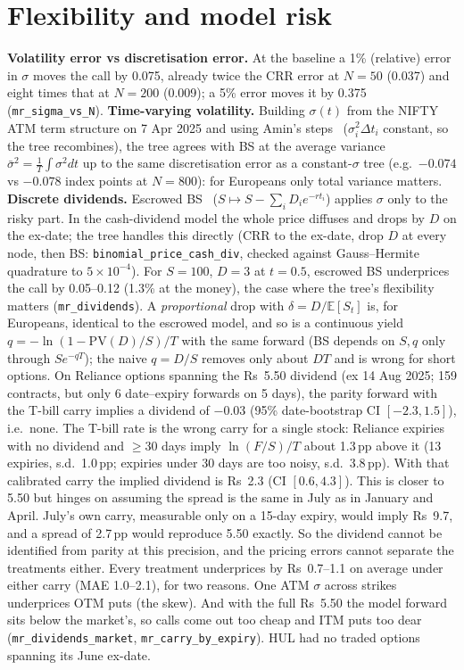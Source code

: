 \documentclass[10pt,a4paper]{article}
\newcommand{\code}[1]{\texttt{\small #1}}
\begin{document}
\section{Flexibility and model risk}
\textbf{Volatility error vs discretisation error.} At the baseline a 1\% (relative) error in $\sigma$ moves the call
by 0.075, already twice the CRR error at $N=50$ (0.037) and eight times that at $N=200$ (0.009); a 5\% error moves
it by 0.375 (\code{mr\_sigma\_vs\_N}).
\textbf{Time-varying volatility.} Building $\sigma(t)$ from the NIFTY ATM term structure on 7 Apr 2025 and using
Amin's steps~\cite{amin} ($\sigma_i^2\Delta t_i$ constant, so the tree recombines), the tree agrees with BS at the average
variance $\bar\sigma^2=\frac1T\int\sigma^2dt$ up to the same discretisation error as a constant-$\sigma$ tree
(e.g.\ $-0.074$ vs $-0.078$ index points at $N=800$): for Europeans only total variance matters.
\textbf{Discrete dividends.} Escrowed BS~\cite{hull} ($S\mapsto S-\sum_iD_ie^{-rt_i}$) applies $\sigma$ only to the risky part.
In the cash-dividend model the whole price diffuses and drops by $D$ on the ex-date; the tree handles this directly
(CRR to the ex-date, drop $D$ at every node, then BS: \code{binomial\_price\_cash\_div}, checked against
Gauss--Hermite quadrature to $5\times10^{-4}$). For $S=100$, $D=3$ at $t=0.5$, escrowed BS underprices the call by
0.05--0.12 (1.3\% at the money), the case where the tree's flexibility matters (\code{mr\_dividends}). A
\emph{proportional} drop with $\delta=D/\mathbb E[S_{t}]$ is, for Europeans, identical to the escrowed model, and so is
a continuous yield $q=-\ln(1-\mathrm{PV}(D)/S)/T$ with the same forward (BS depends on $S,q$ only through $Se^{-qT}$);
the naive $q=D/S$ removes only about $DT$ and is wrong for short options. On
Reliance options spanning the Rs~5.50 dividend (ex 14 Aug 2025; 159 contracts, but only 6 date--expiry forwards on
5 days), the parity forward with the T-bill carry implies a dividend of $-0.03$ (95\% date-bootstrap CI $[-2.3,1.5]$),
i.e.\ none. The T-bill rate is the wrong carry for a single stock: Reliance expiries with no dividend and $\ge30$
days imply $\ln(F/S)/T$ about 1.3\,pp above it (13 expiries, s.d.\ 1.0\,pp; expiries under 30 days are too noisy,
s.d.\ 3.8\,pp). With that calibrated carry the implied dividend is Rs~2.3 (CI $[0.6,4.3]$). This is closer to 5.50 but
hinges on assuming the spread is the same in July as in January and April. July's own carry, measurable only on a
15-day expiry, would imply Rs~9.7, and a spread of 2.7\,pp would reproduce 5.50 exactly. So the dividend cannot be
identified from parity at this precision, and the pricing errors cannot separate the treatments either. Every
treatment underprices by Rs~0.7--1.1 on average under either carry (MAE 1.0--2.1), for two reasons. One ATM
$\sigma$ across strikes underprices OTM puts (the skew). And with the full Rs~5.50 the model forward sits below the
market's, so calls come out too cheap and ITM puts too dear (\code{mr\_dividends\_market}, \code{mr\_carry\_by\_expiry}).
HUL had no traded options spanning its June ex-date.
\end{document}
